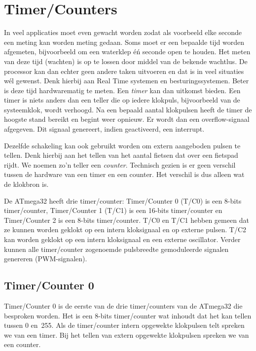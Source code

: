 \chapter{Timer/Counters}
\label{cha:timercounters}
In veel applicaties moet even gewacht worden zodat als voorbeeld elke seconde een
meting kan worden meting gedaan. Soms moet er een bepaalde tijd worden afgemeten,
bijvoorbeeld om een waterklep \'e\'n seconde open te houden. Het meten van deze
tijd (wachten) is op te lossen door
middel van de bekende wachtlus. De processor kan dan echter geen andere taken
uitvoeren en dat is in veel situaties w\'el gewenst. Denk hierbij aan Real Time
systemen en besturingssystemen. Beter is deze tijd hardwarematig te meten.
Een \textsl{timer} kan dan uitkomst bieden. Een timer is niets anders dan een teller
die op iedere klokpuls, bijvoorbeeld van de systeemklok, wordt verhoogd. Na een bepaald
aantal klokpulsen heeft de timer de hoogste stand bereikt en begint weer opnieuw.
Er wordt dan een overflow-signaal afgegeven. Dit signaal genereert, indien geactiveerd,
een interrupt.

Dezelfde schakeling kan ook gebruikt worden om extern aangeboden pulsen te tellen.
Denk hierbij aan het tellen van het aantal fietsen dat over een fietspad rijdt.
We noemen zo'n teller een \textsl{counter}. Technisch gezien is er geen verschil
tussen de hardware van een timer en een counter. Het verschil is dus alleen wat
de klokbron is.

De ATmega32 heeft drie timer/counter: Timer/Counter 0 (T/C0) is een 8-bits
timer/counter, Timer/Counter 1 (T/C1) is een 16-bits timer/counter en
Timer/Counter 2 is een 8-bits timer/counter. T/C0 en T/C1 hebben gemeen dat
ze kunnen worden geklokt op een intern kloksignaal en op externe pulsen.
T/C2 kan worden geklokt op een intern kloksignaal en een externe oscillator.
Verder kunnen alle timer/counter zogenoemde pulsbreedte gemoduleerde signalen
genereren (PWM-signalen). 


\section{Timer/Counter 0}

Timer/Counter 0 is de eerste van de drie timer/counters van de ATmega32 die
besproken worden. Het is een 8-bits timer/counter wat inhoudt dat het kan tellen
tussen 0 en~255. Als de timer/counter intern opgewekte klokpulsen telt spreken
we van een timer. Bij het tellen van extern opgewekte klokpulsen spreken
we van een counter.

